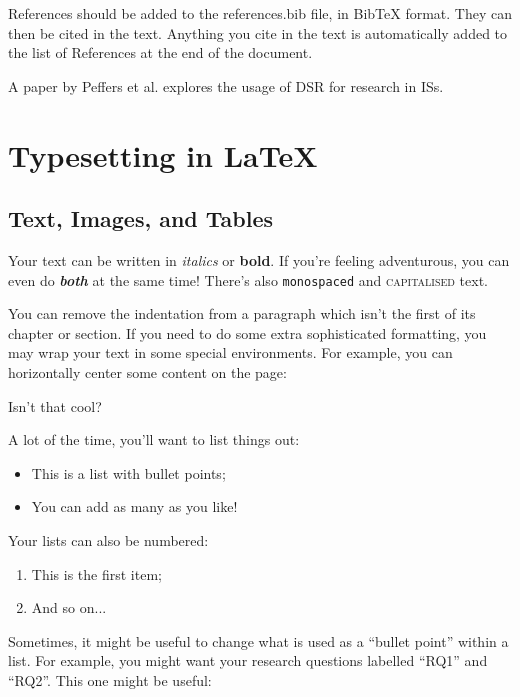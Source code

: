 \documentclass[12pt,reqno,twoside]{amsbook}
\begin{document}
References should be added to the references.bib file, in BibTeX format. They can then be cited in the text. Anything you cite in the text is automatically added to the list of References at the end of the document.

A paper by Peffers et al. \cite{Peffers2007} explores the usage of \ac{DSR} for research in \acp{IS}.










\chapter{Typesetting in \LaTeX}\label{ch:typesetting}

\section{Text, Images, and Tables}\label{sec:text_images_tables}

Your text can be written in \textit{italics} or \textbf{bold}. If you're feeling adventurous, you can even do \textit{\textbf{both}} at the same time! There's also \texttt{monospaced} and \textsc{capitalised} text.

\noindent You can remove the indentation from a paragraph which isn't the first of its chapter or section. If you need to do some extra sophisticated formatting, you may wrap your text in some special environments. For example, you can horizontally center some content on the page:
\begin{center}
    Isn't that cool?
\end{center}

\noindent A lot of the time, you'll want to list things out:
\begin{itemize}
    \item This is a list with bullet points;
    \item You can add as many as you like!
\end{itemize}

\noindent Your lists can also be numbered:
\begin{enumerate}
    \item This is the first item;
    \item And so on...
\end{enumerate}

\noindent Sometimes, it might be useful to change what is used as a ``bullet point'' within a list. For example, you might want your research questions labelled ``RQ1'' and ``RQ2''. This one might be useful:
\end{document}
